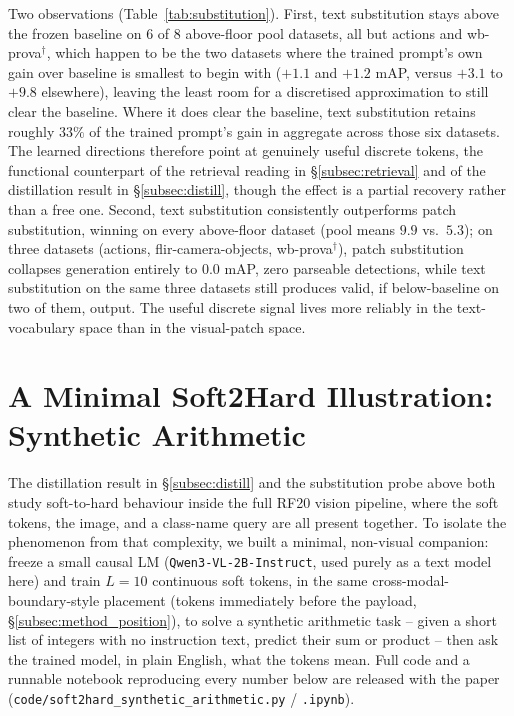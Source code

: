 \documentclass{article}
\begin{document}
Two observations (Table~\ref{tab:substitution}).
First, text substitution stays above the frozen baseline on 6 of 8 above-floor pool datasets, all but actions and wb-prova$^{\dagger}$, which happen to be the two datasets where the trained prompt's own gain over baseline is smallest to begin with ($+1.1$ and $+1.2$ mAP, versus $+3.1$ to $+9.8$ elsewhere), leaving the least room for a discretised approximation to still clear the baseline.
Where it does clear the baseline, text substitution retains roughly $33\%$ of the trained prompt's gain in aggregate across those six datasets.
The learned directions therefore point at genuinely useful discrete tokens, the functional counterpart of the retrieval reading in \S\ref{subsec:retrieval} and of the distillation result in \S\ref{subsec:distill}, though the effect is a partial recovery rather than a free one.
Second, text substitution consistently outperforms patch substitution, winning on every above-floor dataset (pool means $9.9$ vs.\ $5.3$); on three datasets (actions, flir-camera-objects, wb-prova$^{\dagger}$), patch substitution collapses generation entirely to $0.0$ mAP, zero parseable detections, while text substitution on the same three datasets still produces valid, if below-baseline on two of them, output.
The useful discrete signal lives more reliably in the text-vocabulary space than in the visual-patch space.

\section{A Minimal Soft2Hard Illustration: Synthetic Arithmetic}
\label{app:synth_arith}

The distillation result in \S\ref{subsec:distill} and the substitution probe above both study soft-to-hard behaviour inside the full RF20 vision pipeline, where the soft tokens, the image, and a class-name query are all present together.
To isolate the phenomenon from that complexity, we built a minimal, non-visual companion: freeze a small causal LM (\texttt{Qwen3-VL-2B-Instruct}, used purely as a text model here) and train $L{=}10$ continuous soft tokens, in the same cross-modal-boundary-style placement (tokens immediately before the payload, \S\ref{subsec:method_position}), to solve a synthetic arithmetic task -- given a short list of integers with no instruction text, predict their sum or product -- then ask the trained model, in plain English, what the tokens mean.
Full code and a runnable notebook reproducing every number below are released with the paper (\texttt{code/soft2hard\_synthetic\_arithmetic.py} / \texttt{.ipynb}).
\end{document}
